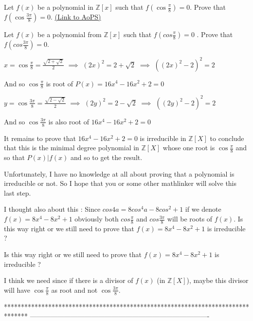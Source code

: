 \begin{problem}
	Let $f(x)$ be a polynomial in $\mathbb{Z}[x] $ such that $f\left(\cos \frac{\pi}{8}\right)=0$. Prove that $f\left(\cos \frac{3\pi}{8}\right)=0$.
	\flushright \href{https://artofproblemsolving.com/community/c6h399329}{(Link to AoPS)}
\end{problem}



\begin{solution}
	\begin{tcolorbox}Let $f(x)$ be a polynomial from $\mathbb{Z}[x] $ such that $f(cos \frac{\pi}{8})=0$ . Prove that $f(cos \frac{3\pi}{8})=0$.\end{tcolorbox}
$x=\cos \frac{\pi}8=\frac{\sqrt{2+\sqrt 2}}2$ $\implies$ $(2x)^2=2+\sqrt 2$ $\implies$ $((2x)^2-2)^2=2$

And so $\cos \frac{\pi}8$ is root of $P(x)=16x^4-16x^2+2=0$

$y=\cos \frac{3\pi}8=\frac{\sqrt{2-\sqrt 2}}2$ $\implies$ $(2y)^2=2-\sqrt 2$ $\implies$ $((2y)^2-2)^2=2$

And so $\cos \frac{3\pi}8$ is also root of $16x^4-16x^2+2=0$

It remains to prove that $16x^4-16x^2+2=0$ is irreducible in $\mathbb Z[X]$ to conclude that this is the minimal degree polynomial in $\mathbb Z[X]$ whose one root is $\cos \frac{\pi}8$ and so that $P(x)|f(x)$ and so to get the result.

Unfortunately, I have no knowledge at all about proving that a polynomial is irreducible or not. So I hope that you or some other mathlinker will solve this last step.
\end{solution}



\begin{solution}
	I thought also about this : Since $cos4a=8cos^4a-8cos^2+1$ if we denote $f(x)=8x^4-8x^2+1$ obviously both $cos\frac{\pi}{8}$ and $cos\frac{3\pi}{8}$ will be roots of $f(x)$. Is this way right or we still need to prove that $f(x)=8x^4-8x^2+1$ is irreducible ?
\end{solution}



\begin{solution}
	\begin{tcolorbox}  Is this way right or we still need to prove that $f(x)=8x^4-8x^2+1$ is irreducible ?\end{tcolorbox}
I think we need since if there is a divisor of $f(x)$ (in $\mathbb Z[X]$), maybe this divisor will have $\cos \frac{\pi}8$ as root and not $\cos \frac{3\pi}8$.
\end{solution}
*******************************************************************************
-------------------------------------------------------------------------------

